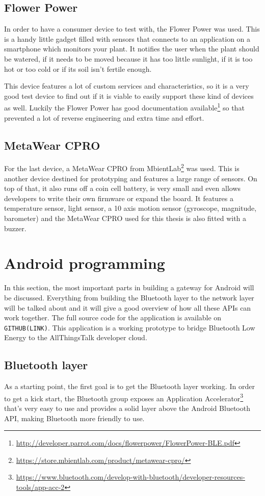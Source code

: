 \documentclass[pdftex,a4paper,12pt,twoside]{report}
\begin{document}
\subsection{Flower Power}
\label{subsec:flowerpower}
In order to have a consumer device to test with, the Flower Power was used. This is a handy little gadget filled with sensors that connects to an application on a smartphone which monitors your plant. It notifies the user when the plant should be watered, if it needs to be moved because it has too little sunlight, if it is too hot or too cold or if its soil isn't fertile enough.

This device features a lot of custom services and characteristics, so it is a very good test device to find out if it is viable to easily support these kind of devices as well. Luckily the Flower Power has good documentation available\footnote{\url{http://developer.parrot.com/docs/flowerpower/FlowerPower-BLE.pdf}} so that prevented a lot of reverse engineering and extra time and effort.

\subsection{MetaWear CPRO}
\label{subsec:metawearcpro}
For the last device, a MetaWear CPRO from MbientLab\footnote{\url{https://store.mbientlab.com/product/metawear-cpro/}} was used. This is another device destined for prototyping and features a large range of sensors. On top of that, it also runs off a coin cell battery, is very small and even allows developers to write their own firmware or expand the board. It features a temperature sensor, light sensor, a 10 axis motion sensor (gyroscope, magnitude, barometer) and the MetaWear CPRO used for this thesis is also fitted with a buzzer.

\section{Android programming}
\label{sec:androidprogramming}
In this section, the most important parts in building a gateway for Android will be discussed. Everything from building the Bluetooth layer to the network layer will be talked about and it will give a good overview of how all these APIs can work together. The full source code for the application is available on \texttt{GITHUB(LINK)}. This application is a working prototype to bridge Bluetooth Low Energy to the AllThingsTalk developer cloud.

\subsection{Bluetooth layer}
\label{subsec:bluetoothlayer}
As a starting point, the first goal is to get the Bluetooth layer working. In order to get a kick start, the Bluetooth group exposes an Application Accelerator\footnote{\url{https://www.bluetooth.com/develop-with-bluetooth/developer-resources-tools/app-acc-2}} that's very easy to use and provides a solid layer above the Android Bluetooth API, making Bluetooth more friendly to use.
\end{document}
